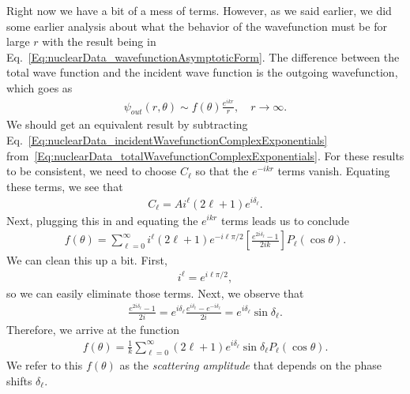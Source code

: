 Right now we have a bit of a mess of terms. However, as we said earlier, we did some earlier analysis about what the behavior of the wavefunction must be for large $r$ with the result being in Eq.~\eqref{Eq:nuclearData_wavefunctionAsymptoticForm}. The difference between the total wave function and the incident wave function is the outgoing wavefunction, which goes as
\begin{align} \label{Eq:nuclearData_outgiongWavefunctionAsymptoticForm}
  \psi_{out}(r,\theta) \sim f(\theta) \frac{e^{ikr}}{r}, \quad r \rightarrow \infty .
\end{align}
We should get an equivalent result by subtracting Eq.~\eqref{Eq:nuclearData_incidentWavefunctionComplexExponentials} from~\eqref{Eq:nuclearData_totalWavefunctionComplexExponentials}. For these results to be consistent, we need to choose $C_\ell$ so that the $e^{-ikr}$ terms vanish. Equating these terms, we see that
\begin{align} \label{Eq:nuclearData_wavefunctionPartialWaveCoefficients}
  C_\ell = A i^\ell (2 \ell + 1 ) e^{i\delta_\ell} .
\end{align}
Next, plugging this in and equating the $e^{ikr}$ terms leads us to conclude
\begin{align} \label{nuclearData_partialWaveAmplitude_Step1}
  f(\theta) = \sum_{\ell=0}^\infty i^\ell ( 2\ell + 1 ) e^{-i\ell\pi/2} \left[ \frac{ e^{2i\delta_\ell} - 1 }{ 2i k } \right] P_\ell(\cos\theta).
\end{align}
We can clean this up a bit. First,
\begin{align}
  i^\ell = e^{i\ell\pi/2}, \nonumber
\end{align}
so we can easily eliminate those terms. Next, we observe that
\begin{align}
  \frac{ e^{2i\delta_\ell} - 1 }{ 2i } = e^{i\delta_\ell} \frac{ e^{i\delta_\ell} - e^{-i\delta_\ell} }{ 2i } = e^{i\delta_\ell} \sin\delta_\ell . \nonumber
\end{align}
Therefore, we arrive at the function
\begin{align} \label{nuclearData_partialWaveAmplitude}
  f(\theta) = \frac{1}{k} \sum_{\ell = 0}^\infty ( 2\ell + 1 ) e^{i\delta_\ell} \sin\delta_\ell P_\ell(\cos\theta) .
\end{align}
We refer to this $f(\theta)$ as the \emph{scattering amplitude} that depends on the phase shifts $\delta_\ell$.

